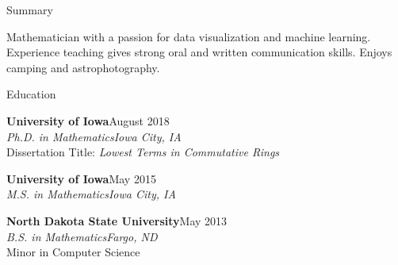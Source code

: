 \documentclass{resume} %
\begin{document}

\begin{rSection}{Summary}

Mathematician with a passion for data visualization and machine learning. Experience teaching gives strong oral and written communication skills. Enjoys camping and astrophotography.

\end{rSection}





\begin{rSection}{Education}

{\bf University of Iowa}\hfill August 2018\\
{\em Ph.D. in Mathematics}\hfill {\em Iowa City, IA}\\
Dissertation Title: {\sl Lowest Terms in Commutative Rings}

{\bf University of Iowa}\hfill May 2015\\
{\em M.S. in Mathematics}\hfill {\em Iowa City, IA}

{\bf North Dakota State University}\hfill May 2013\\
{\em B.S. in Mathematics}\hfill {\em Fargo, ND}\\
Minor in Computer Science


\end{rSection}
\end{document}
